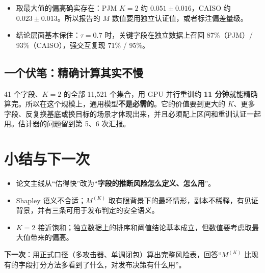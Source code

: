 \documentclass[zihao=-4,a4paper]{ctexart}
\newcommand{\M}{M^{(K)}}
\begin{document}
\begin{itemize}[leftmargin=*]
  \item 取最大值的偏高确实存在：PJM $K=2$ 约 $0.051\pm0.016$，CAISO 约 $0.023\pm0.013$。所以报告的 $M$ 数值要用独立认证值，或者标注偏差量级。
  \item 结论层面基本保住：$\tau=0.7$ 时，关键字段在独立数据上召回 87\%（PJM）/ 93\%（CAISO），强交互复现 71\% / 95\%。
\end{itemize}

\subsection{一个伏笔：精确计算其实不慢}

41 个字段、$K=2$ 的全部 11,521 个集合，用 GPU 并行重训约 \textbf{11 分钟}就能精确算完。所以在这个规模上，通用模型\textbf{不是必需的}。它的价值要到更大的 $K$、更多字段、反复换基底或换目标的场景才体现出来，并且必须配上区间和重训认证一起用。估计器的问题留到第 5、6 次汇报。

\section{小结与下一次}

\begin{keybox}[小结]
\begin{itemize}[leftmargin=*]
  \item 论文主线从“估得快”改为“\textbf{字段的推断风险怎么定义、怎么用}”。
  \item Shapley 语义不合适；$\M$ 取有限背景下的最坏情形，副本不稀释，有见证背景，并有三条可用于发布判定的安全语义。
  \item $K=2$ 接近饱和；独立数据上的排序和阈值结论基本成立，但数值要考虑取最大值带来的偏高。
\end{itemize}
\end{keybox}

\textbf{下一次}：用正式口径（多攻击器、单调闭包）算出完整风险表，回答“$\M$ 比现有的字段打分方法多看到了什么，对发布决策有什么用”。
\end{document}
